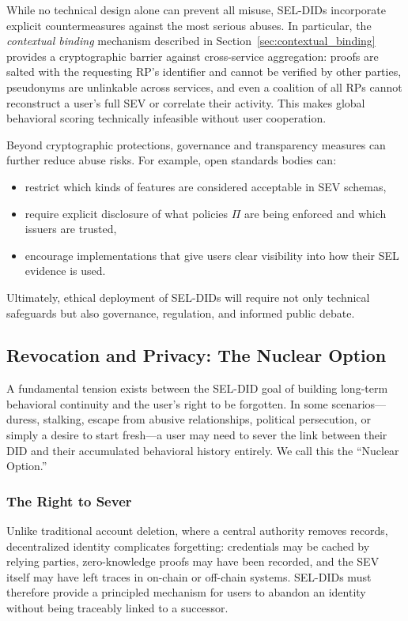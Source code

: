 \documentclass[11pt]{article}
\begin{document}
While no technical design alone can prevent all misuse, SEL-DIDs incorporate explicit countermeasures against the most serious abuses. In particular, the \emph{contextual binding} mechanism described in Section~\ref{sec:contextual_binding} provides a cryptographic barrier against cross-service aggregation: proofs are salted with the requesting RP's identifier and cannot be verified by other parties, pseudonyms are unlinkable across services, and even a coalition of all RPs cannot reconstruct a user's full SEV or correlate their activity. This makes global behavioral scoring technically infeasible without user cooperation.

Beyond cryptographic protections, governance and transparency measures can further reduce abuse risks. For example, open standards bodies can:

\begin{itemize}
  \item restrict which kinds of features are considered acceptable in SEV schemas,
  \item require explicit disclosure of what policies $\Pi$ are being enforced and which issuers are trusted,
  \item encourage implementations that give users clear visibility into how their SEL evidence is used.
\end{itemize}

Ultimately, ethical deployment of SEL-DIDs will require not only technical safeguards but also governance, regulation, and informed public debate.

\subsection{Revocation and Privacy: The Nuclear Option}

A fundamental tension exists between the SEL-DID goal of building long-term behavioral continuity and the user's right to be forgotten. In some scenarios---duress, stalking, escape from abusive relationships, political persecution, or simply a desire to start fresh---a user may need to sever the link between their DID and their accumulated behavioral history entirely. We call this the ``Nuclear Option.''

\subsubsection{The Right to Sever}

Unlike traditional account deletion, where a central authority removes records, decentralized identity complicates forgetting: credentials may be cached by relying parties, zero-knowledge proofs may have been recorded, and the SEV itself may have left traces in on-chain or off-chain systems. SEL-DIDs must therefore provide a principled mechanism for users to abandon an identity without being traceably linked to a successor.
\end{document}
